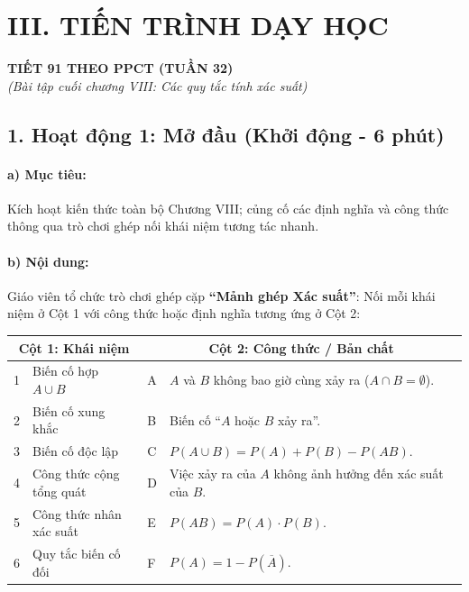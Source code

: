 \documentclass[12pt, a4paper]{article}
\begin{document}
\section*{III. TIẾN TRÌNH DẠY HỌC}

\begin{center}
    \textbf{\large TIẾT 91 THEO PPCT (TUẦN 32)}\\[4pt]
    \textit{(Bài tập cuối chương VIII: Các quy tắc tính xác suất)}
\end{center}

\subsection*{1. Hoạt động 1: Mở đầu (Khởi động - 6 phút)}

\paragraph{a) Mục tiêu:} Kích hoạt kiến thức toàn bộ Chương VIII; củng cố các định nghĩa và công thức thông qua trò chơi ghép nối khái niệm tương tác nhanh.

\paragraph{b) Nội dung:} Giáo viên tổ chức trò chơi ghép cặp \textbf{``Mảnh ghép Xác suất''}: Nối mỗi khái niệm ở Cột 1 với công thức hoặc định nghĩa tương ứng ở Cột 2:
\begin{center}
\small
\begin{tabularx}{\linewidth}{|l|X|l|X|}
\hline
\multicolumn{2}{|c|}{\textbf{Cột 1: Khái niệm}} & \multicolumn{2}{c|}{\textbf{Cột 2: Công thức / Bản chất}} \\ \hline
1 & Biến cố hợp $A \cup B$ & A & $A$ và $B$ không bao giờ cùng xảy ra ($A \cap B = \emptyset$). \\ \hline
2 & Biến cố xung khắc & B & Biến cố ``$A$ hoặc $B$ xảy ra''. \\ \hline
3 & Biến cố độc lập & C & $P(A \cup B) = P(A) + P(B) - P(AB)$. \\ \hline
4 & Công thức cộng tổng quát & D & Việc xảy ra của $A$ không ảnh hưởng đến xác suất của $B$. \\ \hline
5 & Công thức nhân xác suất & E & $P(AB) = P(A) \cdot P(B)$. \\ \hline
6 & Quy tắc biến cố đối & F & $P(A) = 1 - P(\overline{A})$. \\ \hline
\end{tabularx}
\end{center}
\end{document}
